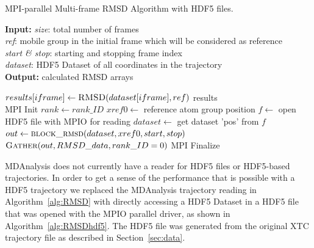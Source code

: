 \begin{algorithm}[ht]
	\scriptsize
	\caption{MPI-parallel Multi-frame RMSD Algorithm with HDF5 files.}
	\label{alg:RMSDhdf5}
	\hspace*{\algorithmicindent} \textbf{Input:} \emph{size}: total number of frames \\
	\hspace*{\algorithmicindent} \emph{ref}: mobile group in the initial frame which will be considered as reference \\
	\hspace*{\algorithmicindent} \emph{start \& stop}: starting and stopping frame index\\
	\hspace*{\algorithmicindent} \emph{dataset}: HDF5 Dataset of all coordinates in the trajectory \\
	\hspace*{\algorithmicindent} \textbf{Output:} calculated RMSD arrays
	\begin{algorithmic}[1]
		\State $results[iframe] \gets \Call{RMSD}{dataset[iframe], ref}$ 
		\EndFor
		\State \Return results
		\EndFunction
		\\        
		\State MPI Init
		\State $rank \gets rank\_ID$
		\State $xref0 \gets$ reference atom group position
                \State $f \gets$ open HDF5 file with MPIO for reading
                \State $dataset \gets$ get dataset 'pos' from $f$
		\State $out \gets \Call{block\_rmsd}{dataset, xref0, start, stop}$
                \\
		\State $\Call{Gather}{out, RMSD\_data, rank\_ID=0}$
		\State MPI Finalize
	\end{algorithmic}
\end{algorithm}

MDAnalysis does not currently have a reader for HDF5 files or HDF5-based trajectories.
In order to get a sense of the performance that is possible with a HDF5 trajectory we replaced the MDAnalysis trajectory reading in Algorithm~\ref{alg:RMSD} with directly accessing a HDF5 Dataset in a HDF5 file that was opened with the MPIO parallel driver, as shown in Algorithm~\ref{alg:RMSDhdf5}.
The HDF5 file was generated from the original XTC trajectory file as described in Section~\ref{sec:data}.